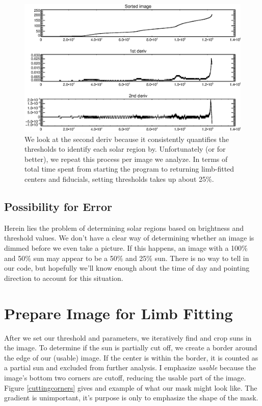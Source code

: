 \documentclass[10pt]{scrartcl}
\begin{document}
\begin{figure}[!ht]
    \centering
    \includegraphics[width=.9\textwidth]{../plots_tables_images/sortedarray.eps}    
    \caption{We look at the second deriv because it consistently quantifies the thresholds to identify each solar region by. Unfortunately (or for better), we repeat this process per image we analyze. In terms of total time spent from starting the program to returning limb-fitted centers and fiducials, setting thresholds takes up about 25\%.}
    \label{sortedarray}
\end{figure}

\subsection{Possibility for Error} %
\label{sub:possibility_for_error}
Herein lies the problem of determining solar regions based on brightness and threshold values. We don't have a clear way of determining whether an image is dimmed before we even take a picture. If this happens, an image with a 100\% and 50\% sun may appear to be a 50\% and 25\% sun. There is no way to tell in our code, but hopefully we'll know enough about the time of day and pointing direction to account for this situation.


\section{Prepare Image for Limb Fitting} %
\label{sec:prepare_image_for_limb_fitting}
After we set our threshold and parameters, we iteratively find and crop suns in the image. To determine if the sun is partially cut off, we create a border around the edge of our (usable) image. If the center is within the border, it is counted as a partial sun and excluded from further analysis. I emphasize \emph{usable} because the image's bottom two corners are cutoff, reducing the usable part of the image. Figure \ref{cuttingcorners} gives and example of what our mask might look like. The gradient is unimportant, it's purpose is only to emphasize the shape of the mask.
\end{document}
